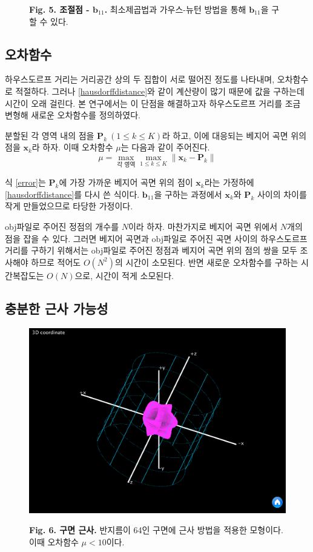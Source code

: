 \documentclass{Humantech_Paper_Awardfullpaper_hutech}
\begin{document}
\begin{figure}[h]
\begin{center}
\begin{subfigure}{.2\textwidth}
		\end{subfigure}
	\end{center} 
	\raggedright \small \textbf{Fig. 5. 조절점 - $\mathbf{b}_{11}$.} 최소제곱법과 가우스-뉴턴 방법을 통해 $\mathbf{b}_{11}$을 구할 수 있다. 
\end{figure}

\subsection{오차함수}
하우스도르프 거리는 거리공간 상의 두 집합이 서로 떨어진 정도를 나타내며, 오차함수로 적절하다. 그러나 \eqref{hausdorffdistance}와 같이 계산량이 많기 때문에 값을 구하는데 시간이 오래 걸린다. 본 연구에서는 이 단점을 해결하고자 하우스도르프 거리를 조금 변형해 새로운 오차함수를 정의하였다. 
\begin{defn}
	분할된 각 영역 내의 점을 $\mathbf{P}_k\ (1\leq k\leq K)$라 하고, 이에 대응되는 베지어 곡면 위의 점을 $\mathbf{x}_k$라 하자. 이때 오차함수 $\mu$는 다음과 같이 주어진다.
	\begin{equation} \label{error}
		\mu=\max_{\text{각 영역}}\max_{1\leq k\leq K} \| \mathbf{x}_k-\mathbf{P}_k \|
	\end{equation}
\end{defn}

식 \eqref{error}는 $\mathbf{P}_k$에 가장 가까운 베지어 곡면 위의 점이 $\mathbf{x}_k$라는 가정하에 \eqref{hausdorffdistance}를 다시 쓴 식이다. $\mathbf{b}_{11}$을 구하는 과정에서 $\mathbf{x}_k$와 $\mathbf{P}_k$ 사이의 차이를 작게 만들었으므로 타당한 가정이다. 

obj파일로 주어진 정점의 개수를 $N$이라 하자. 마찬가지로 베지어 곡면 위에서 $N$개의 점을 잡을 수 있다. 그러면 베지어 곡면과 obj파일로 주어진 곡면 사이의 하우스도르프 거리를 구하기 위해서는 obj파일로 주어진 정점과 베지어 곡면 위의 점의 쌍을 모두 조사해야 하므로 적어도 $O(N^2)$의 시간이 소모된다. 반면 새로운 오차함수를 구하는 시간복잡도는 $O(N)$으로, 시간이 적게 소모된다. 

\subsection{충분한 근사 가능성}
\begin{figure}[h]
	\begin{center}
		\includegraphics[width=.5\textwidth]{gg}
	\end{center} 
	\raggedright \small \textbf{Fig. 6. 구면 근사.} 반지름이 64인 구면에 근사 방법을 적용한 모형이다. 이때 오차함수 $\mu < 10$이다. 
\end{figure}
\end{document}
